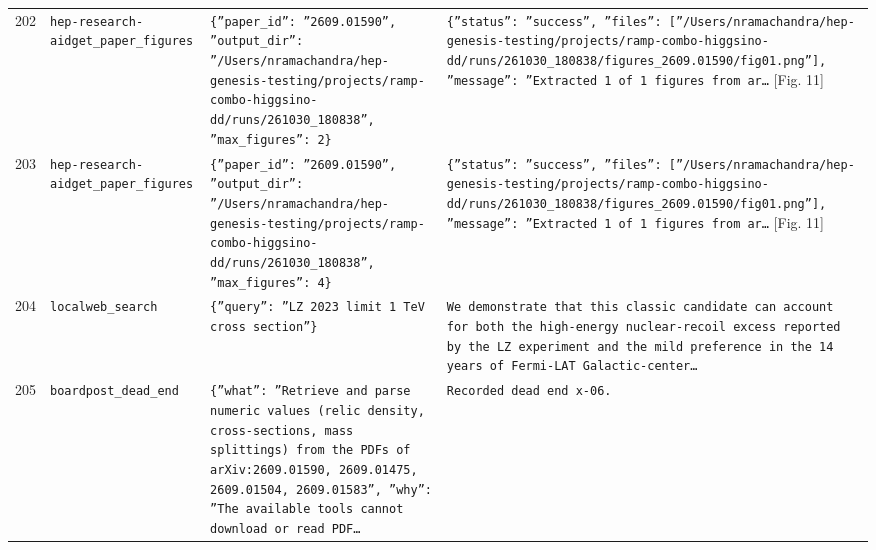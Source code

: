 \documentclass[11pt,a4paper]{article}
\begin{document}
\begin{longtable}{@{}p{}p{}p{}p{}@{}}
202 & \texttt{hep-research-aid}\newline\texttt{get\_\allowbreak{}paper\_\allowbreak{}figures} & \texttt{\{''paper\_\allowbreak{}id'':\allowbreak{} ''2609.01590'',\allowbreak{} ''output\_\allowbreak{}dir'':\allowbreak{} ''/\allowbreak{}Users/\allowbreak{}nramachandra/\allowbreak{}hep-genesis-testing/\allowbreak{}projects/\allowbreak{}ramp-combo-higgsino-dd/\allowbreak{}runs/\allowbreak{}261030\_\allowbreak{}180838'',\allowbreak{} ''max\_\allowbreak{}figures'':\allowbreak{} 2\}\allowbreak{}} & \texttt{\{''status'':\allowbreak{} ''success'',\allowbreak{} ''files'':\allowbreak{} [''/\allowbreak{}Users/\allowbreak{}nramachandra/\allowbreak{}hep-genesis-testing/\allowbreak{}projects/\allowbreak{}ramp-combo-higgsino-dd/\allowbreak{}runs/\allowbreak{}261030\_\allowbreak{}180838/\allowbreak{}figures\_\allowbreak{}2609.01590/\allowbreak{}fig01.png'']\allowbreak{},\allowbreak{} ''message'':\allowbreak{} ''Extracted 1 of 1 figures from ar\ldots{}\allowbreak{}} [Fig. 11] \\
203 & \texttt{hep-research-aid}\newline\texttt{get\_\allowbreak{}paper\_\allowbreak{}figures} & \texttt{\{''paper\_\allowbreak{}id'':\allowbreak{} ''2609.01590'',\allowbreak{} ''output\_\allowbreak{}dir'':\allowbreak{} ''/\allowbreak{}Users/\allowbreak{}nramachandra/\allowbreak{}hep-genesis-testing/\allowbreak{}projects/\allowbreak{}ramp-combo-higgsino-dd/\allowbreak{}runs/\allowbreak{}261030\_\allowbreak{}180838'',\allowbreak{} ''max\_\allowbreak{}figures'':\allowbreak{} 4\}\allowbreak{}} & \texttt{\{''status'':\allowbreak{} ''success'',\allowbreak{} ''files'':\allowbreak{} [''/\allowbreak{}Users/\allowbreak{}nramachandra/\allowbreak{}hep-genesis-testing/\allowbreak{}projects/\allowbreak{}ramp-combo-higgsino-dd/\allowbreak{}runs/\allowbreak{}261030\_\allowbreak{}180838/\allowbreak{}figures\_\allowbreak{}2609.01590/\allowbreak{}fig01.png'']\allowbreak{},\allowbreak{} ''message'':\allowbreak{} ''Extracted 1 of 1 figures from ar\ldots{}\allowbreak{}} [Fig. 11] \\
204 & \texttt{local}\newline\texttt{web\_\allowbreak{}search} & \texttt{\{''query'':\allowbreak{} ''LZ 2023 limit 1 TeV cross section''\}\allowbreak{}} & \texttt{We demonstrate that this classic candidate can account for both the high-energy nuclear-recoil excess reported by the LZ experiment and the mild preference in the 14 years of Fermi-LAT Galactic-center\ldots{}\allowbreak{}} \\
205 & \texttt{board}\newline\texttt{post\_\allowbreak{}dead\_\allowbreak{}end} & \texttt{\{''what'':\allowbreak{} ''Retrieve and parse numeric values (relic density,\allowbreak{} cross-sections,\allowbreak{} mass splittings)\allowbreak{} from the PDFs of arXiv:\allowbreak{}2609.01590,\allowbreak{} 2609.01475,\allowbreak{} 2609.01504,\allowbreak{} 2609.01583'',\allowbreak{} ''why'':\allowbreak{} ''The available tools cannot download or read PDF\ldots{}\allowbreak{}} & \texttt{Recorded dead end x-06.} \\

\end{longtable}
\end{document}
